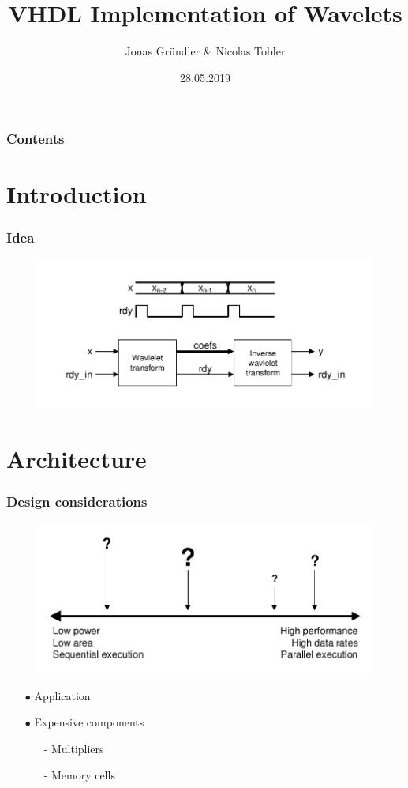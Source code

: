 \documentclass[english, aspectratio=169]{beamer}
\title{VHDL Implementation of Wavelets}
\author{Jonas Gründler \& Nicolas Tobler }
\institute{Mathematisches Seminar 2019}
\date{28.05.2019}
\begin{document}
\begin{frame}
\titlepage
\end{frame}

\begin{frame}
\frametitle{Contents}
\tableofcontents
\end{frame}

\section{Introduction}
\begin{frame}

\frametitle{Idea}
\begin{figure}
	\includegraphics[scale=0.7]{idea.pdf}
\end{figure}
\end{frame}


\section{Architecture}
\begin{frame}
\frametitle{Design considerations}

\begin{figure}
	\includegraphics[scale=0.7]{design_considerations.pdf}
\end{figure}

\begin{itemize}
	
	\item[$\bullet$] Application

	\item[$\bullet$] Expensive components
	\begin{itemize}
		\item[-] Multipliers
		\item[-] Memory cells
	\end{itemize}
	
\end{itemize}
\end{frame}
\end{document}
